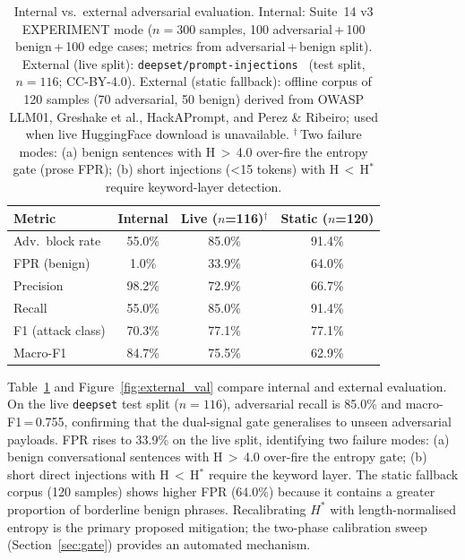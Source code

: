 \documentclass[11pt,twocolumn]{article}
\begin{document}
\begin{table}[t]
\centering
\caption{Internal vs.\ external adversarial evaluation.
  Internal: Suite~14 v3 EXPERIMENT mode ($n=300$ samples, 100 adversarial\,+\,100
  benign\,+\,100 edge cases; metrics from adversarial\,+\,benign split).
  External (live split): \texttt{deepset/prompt-injections}~\cite{deepset2023injections}
  (test split, $n=116$; CC-BY-4.0).
  External (static fallback): offline corpus of 120 samples (70 adversarial,
  50 benign) derived from OWASP LLM01, Greshake et al., HackAPrompt, and
  Perez \& Ribeiro; used when live HuggingFace download is unavailable.
  $^\dagger$\,Two failure modes: (a) benign sentences with H\,$>$\,4.0
  over-fire the entropy gate (prose FPR); (b) short injections
  (\textless 15 tokens) with H\,$<$\,H$^{*}$ require keyword-layer detection.}
\label{tab:external}
{\small
\renewcommand{\arraystretch}{1.15}
\begin{tabular}{@{}lccc@{}}
\toprule
\textbf{Metric} & \textbf{Internal} & \textbf{Live ($n$=116)$^\dagger$} & \textbf{Static ($n$=120)} \\
\midrule
Adv.\ block rate   & 55.0\%  & 85.0\%  & 91.4\% \\
FPR (benign)       & 1.0\%   & 33.9\%  & 64.0\% \\
Precision          & 98.2\%  & 72.9\%  & 66.7\% \\
Recall             & 55.0\%  & 85.0\%  & 91.4\% \\
F1 (attack class)  & 70.3\%  & 77.1\%  & 77.1\% \\
Macro-F1           & 84.7\%  & 75.5\%  & 62.9\% \\
\bottomrule
\end{tabular}
}
\end{table}

Table~\ref{tab:external} and Figure~\ref{fig:external_val} compare internal and
external evaluation. On the live \texttt{deepset} test split ($n=116$),
adversarial recall is 85.0\% and macro-F1\,=\,0.755, confirming that the
dual-signal gate generalises to unseen adversarial payloads. FPR rises to
33.9\% on the live split, identifying two failure modes: (a) benign
conversational sentences with H\,$>$\,4.0 over-fire the entropy gate; (b) short
direct injections with H\,$<$\,H$^{*}$ require the keyword layer. The static
fallback corpus (120 samples) shows higher FPR (64.0\%) because it contains
a greater proportion of borderline benign phrases. Recalibrating $H^{*}$ with
length-normalised entropy is the primary proposed mitigation; the two-phase
calibration sweep (Section~\ref{sec:gate}) provides an automated mechanism.
\end{document}
